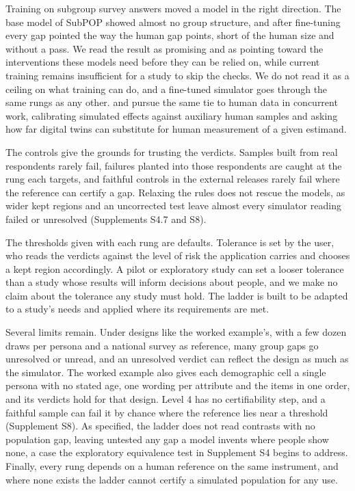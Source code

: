 Training on subgroup survey answers moved a model in the right direction.
The base model of SubPOP showed almost no group structure, and after fine-tuning every gap pointed the way the human gap points, short of the human size and without a pass.
We read the result as promising and as pointing toward the interventions these models need before they can be relied on, while current training remains insufficient for a study to skip the checks.
We do not read it as a ceiling on what training can do, and a fine-tuned simulator goes through the same rungs as any other.
\citet{hullman2026validating} and \citet{wang2026substitutability} pursue the same tie to human data in concurrent work, calibrating simulated effects against auxiliary human samples and asking how far digital twins can substitute for human measurement of a given estimand.

The controls give the grounds for trusting the verdicts.
Samples built from real respondents rarely fail, failures planted into those respondents are caught at the rung each targets, and faithful controls in the external releases rarely fail where the reference can certify a gap.
Relaxing the rules does not rescue the models, as wider kept regions and an uncorrected test leave almost every simulator reading failed or unresolved (Supplements S4.7 and S8).

The thresholds given with each rung are defaults.
Tolerance is set by the user, who reads the verdicts against the level of risk the application carries and chooses a kept region accordingly.
A pilot or exploratory study can set a looser tolerance than a study whose results will inform decisions about people, and we make no claim about the tolerance any study must hold.
The ladder is built to be adapted to a study's needs and applied where its requirements are met.

Several limits remain.
Under designs like the worked example's, with a few dozen draws per persona and a national survey as reference, many group gaps go unresolved or unread, and an unresolved verdict can reflect the design as much as the simulator.
The worked example also gives each demographic cell a single persona with no stated age, one wording per attribute and the items in one order, and its verdicts hold for that design.
Level 4 has no certifiability step, and a faithful sample can fail it by chance where the reference lies near a threshold (Supplement S8).
As specified, the ladder does not read contrasts with no population gap, leaving untested any gap a model invents where people show none, a case the exploratory equivalence test in Supplement S4 begins to address.
Finally, every rung depends on a human reference on the same instrument, and where none exists the ladder cannot certify a simulated population for any use.

